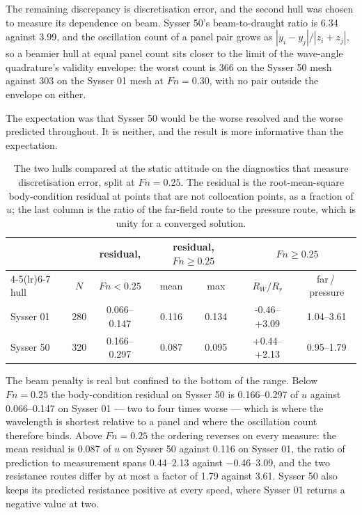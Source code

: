 \documentclass[11pt]{article}
\newcommand{\Fn}{\mathit{Fn}}
\begin{document}
The remaining discrepancy is discretisation error, and the second hull was chosen to measure
its dependence on beam. Sysser 50's beam-to-draught ratio is \num{6.34} against \num{3.99}, and the
oscillation count of a panel pair grows as $|y_i - y_j|/|z_i + z_j|$, so a beamier hull at
equal panel count sits closer to the limit of the wave-angle quadrature's validity envelope:
the worst count is \num{366} on the Sysser 50 mesh against \num{303} on the Sysser 01 mesh at $\Fn = 0.30$, with no pair outside the envelope on either.

The expectation was that Sysser 50 would be the worse resolved and the worse predicted
throughout. It is neither, and the result is more informative than the expectation.
\begin{table}[htbp]
\centering
\caption{The two hulls compared at the static attitude on the diagnostics that measure
discretisation error, split at $\Fn = 0.25$. The residual is the root-mean-square
body-condition residual at points that are not collocation points, as a fraction of $u$; the
last column is the ratio of the far-field route to the pressure route, which is unity for a
converged solution.}
\label{tab:compare}
\small
\begin{tabular}{@{}lcccccc@{}}
\toprule
& & residual, & \multicolumn{2}{c}{residual, $\Fn \ge 0.25$}
& \multicolumn{2}{c}{$\Fn \ge 0.25$} \\
\cmidrule(lr){4-5}\cmidrule(lr){6-7}
hull & $N$ & $\Fn < 0.25$ & mean & max & $R_W/R_r$ & far\,/\,pressure \\
\midrule
Sysser 01 & 280 & 0.066--0.147 & 0.116 & 0.134 & -0.46--+3.09 & 1.04--3.61 \\
Sysser 50 & 320 & 0.166--0.297 & 0.087 & 0.095 & +0.44--+2.13 & 0.95--1.79 \\
\bottomrule
\end{tabular}
\end{table}

The beam penalty is real but confined to the bottom of the range. Below $\Fn = 0.25$ the
body-condition residual on Sysser 50 is \numrange{0.166}{0.297} of $u$ against \numrange{0.066}{0.147} on Sysser 01 --- two
to four times worse --- which is where the wavelength is shortest relative to a panel and
where the oscillation count therefore binds. Above $\Fn = 0.25$ the ordering reverses on
every measure: the mean residual is \num{0.087} of $u$ on Sysser 50 against \num{0.116} on Sysser 01, the ratio of prediction to measurement spans \numrange{0.44}{2.13} against \numrange{-0.46}{3.09}, and the two resistance routes differ by at most a factor of \num{1.79} against \num{3.61}. Sysser 50 also keeps its predicted resistance positive at every speed,
where Sysser 01 returns a negative value at two.
\end{document}
